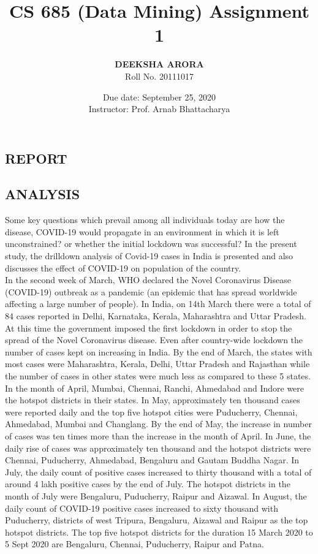 \documentclass{article}
\title{CS 685 (Data Mining)
Assignment 1}
\author{\textbf{DEEKSHA ARORA} \\ Roll No. 20111017}
\date{Due date: September 25, 2020 \\ Instructor: Prof. Arnab Bhattacharya}
\begin{document}
\maketitle
\pagebreak
\lstset{style=mystyle}
\begin{center}
\section{{REPORT}}
\end{center}
\subsection{ANALYSIS}
Some key questions which prevail among all individuals today are how the disease, COVID-19 would propagate in an environment in which it is left unconstrained? or whether the initial lockdown was successful? In the present study, the drilldown analysis of Covid-19 cases in India is presented and also discusses the effect of COVID-19 on population of the country.\\
In the second week of March, WHO declared the Novel Coronavirus Disease (COVID-19) outbreak as a pandemic (an epidemic that has spread worldwide affecting a large number of people).  In India, on 14th March there were a total of 84 cases reported in Delhi, Karnataka, Kerala, Maharashtra and Uttar Pradesh. At this time the government imposed the first lockdown in order to stop the spread of the Novel Coronavirus disease. Even after country-wide lockdown the number of cases kept on increasing in India. By the end of March, the states with most cases were Maharashtra, Kerala, Delhi, Uttar Pradesh and Rajasthan while the number of cases in other states were much less as compared to these 5 states. 
In the month of April, Mumbai, Chennai, Ranchi, Ahmedabad and Indore were the hotspot districts in their states. In May, approximately ten thousand cases were reported daily and the top five hotspot cities were Puducherry, Chennai, Ahmedabad, Mumbai and Changlang. By the end of May, the increase in number of cases was ten times more than the increase in the month of April. In June, the daily rise of cases was approximately ten thousand and the hotspot districts were Chennai, Puducherry, Ahmedabad, Bengaluru and Gautam Buddha Nagar. In July, the daily count of positive cases increased to thirty thousand with a total of around 4 lakh positive cases by the end of July. The hotspot districts in the month of July were Bengaluru, Puducherry, Raipur and Aizawal. In August, the daily count of COVID-19 positive cases increased to sixty thousand with Puducherry, districts of west Tripura, Bengaluru, Aizawal and Raipur as the top hotspot districts. The top five hotspot districts for the duration 15 March 2020 to 5 Sept 2020 are Bengaluru, Chennai, Puducherry, Raipur and Patna.\\
\end{document}
